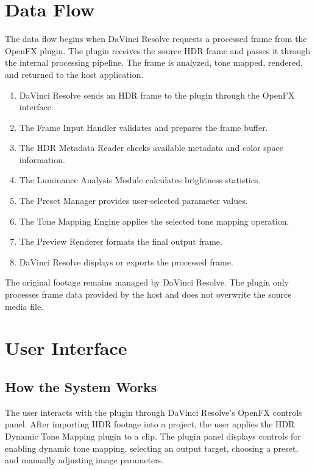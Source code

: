 \documentclass[12pt,hyphens]{article}
\begin{document}
\section{Data Flow}

The data flow begins when DaVinci Resolve requests a processed frame from the OpenFX plugin. The plugin receives the source HDR frame and passes it through the internal processing pipeline. The frame is analyzed, tone mapped, rendered, and returned to the host application.

\begin{enumerate}[leftmargin=0.35in]
    \item DaVinci Resolve sends an HDR frame to the plugin through the OpenFX interface.
    \item The Frame Input Handler validates and prepares the frame buffer.
    \item The HDR Metadata Reader checks available metadata and color space information.
    \item The Luminance Analysis Module calculates brightness statistics.
    \item The Preset Manager provides user-selected parameter values.
    \item The Tone Mapping Engine applies the selected tone mapping operation.
    \item The Preview Renderer formats the final output frame.
    \item DaVinci Resolve displays or exports the processed frame.
\end{enumerate}

The original footage remains managed by DaVinci Resolve. The plugin only processes frame data provided by the host and does not overwrite the source media file.


\section{User Interface}

\subsection{How the System Works}
The user interacts with the plugin through DaVinci Resolve's OpenFX controls panel. After importing HDR footage into a project, the user applies the HDR Dynamic Tone Mapping plugin to a clip. The plugin panel displays controls for enabling dynamic tone mapping, selecting an output target, choosing a preset, and manually adjusting image parameters.
\end{document}
